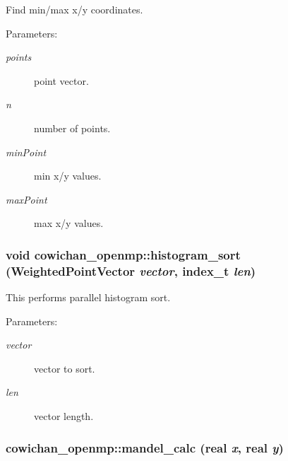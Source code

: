 Find min/max x/y coordinates. \begin{Desc}
\item[Parameters:]
\begin{description}
\item[{\em points}]point vector. \item[{\em n}]number of points. \item[{\em minPoint}]min x/y values. \item[{\em maxPoint}]max x/y values. \end{description}
\end{Desc}
\hypertarget{namespacecowichan__openmp_9cbb3540b84f4e051f072a08c2c1d5db}{
\subsubsection[{histogram\_\-sort}]{\setlength{\rightskip}{0pt plus 5cm}void cowichan\_\-openmp::histogram\_\-sort ({\bf WeightedPointVector} {\em vector}, \/  {\bf index\_\-t} {\em len})}}
\label{namespacecowichan__openmp_9cbb3540b84f4e051f072a08c2c1d5db}


This performs parallel histogram sort. \begin{Desc}
\item[Parameters:]
\begin{description}
\item[{\em vector}]vector to sort. \item[{\em len}]vector length. \end{description}
\end{Desc}
\hypertarget{namespacecowichan__openmp_2753e3856bc41c61099c4702d789823e}{
\subsubsection[{mandel\_\-calc}]{ cowichan\_\-openmp::mandel\_\-calc ({\bf real} {\em x}, \/  {\bf real} {\em y})}}
\label{namespacecowichan__openmp_2753e3856bc41c61099c4702d789823e}


